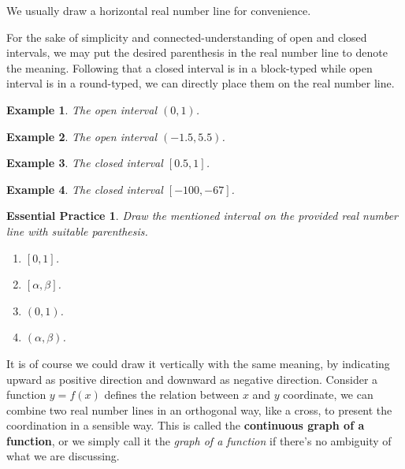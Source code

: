 \documentclass[12pt]{article}
\newtheorem*{example}{Example}
\newtheorem{exercise}{Essential Practice}[subsubsection]
\begin{document}
    We usually draw a horizontal real number line for convenience.

    \begin{figure}[H]
        \centering
    \end{figure}

    For the sake of simplicity and connected-understanding of open and closed intervals, we may put the desired parenthesis in the real number line to denote the meaning. Following that a closed interval is in a block-typed while open interval is in a round-typed, we can directly place them on the real number line.

    \begin{example}
        The open interval $(0,1)$.
    \end{example}

    \begin{example}
        The open interval $(-1.5,5.5)$.
    \end{example}

    \begin{example}
        The closed interval $[0.5,1]$.
    \end{example}

    \begin{example}
        The closed interval $[-100,-67]$.
    \end{example}

    \begin{exercise}
        Draw the mentioned interval on the provided real number line with suitable parenthesis.
        \begin{enumerate}
            \item $[0,1]$.
            \item $[\alpha,\beta]$.
            \item $(0,1)$.
            \item $(\alpha,\beta)$.
        \end{enumerate}
    \end{exercise}

    It is of course we could draw it vertically with the same meaning, by indicating upward as positive direction and downward as negative direction. Consider a function $y=f(x)$ defines the relation between $x$ and $y$ coordinate, we can combine two real number lines in an orthogonal way, like a cross, to present the coordination in a sensible way. This is called the \textbf{continuous graph of a function}, or we simply call it the \textit{graph of a function} if there's no ambiguity of what we are discussing.
\end{document}
